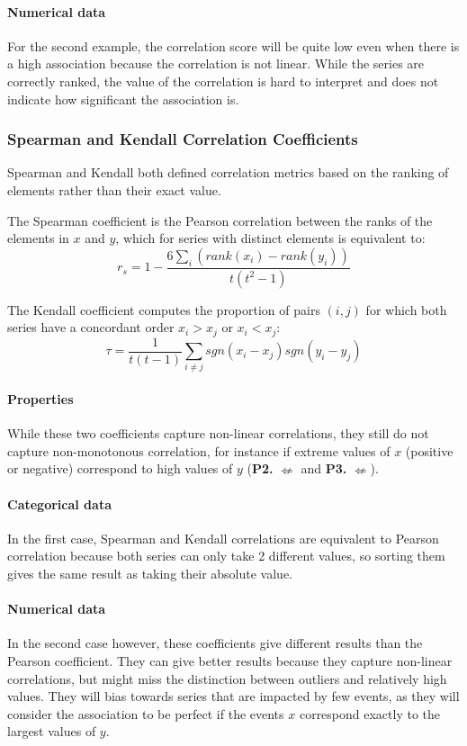 \documentclass[12pt,a4paper]{article}
\begin{document}
\paragraph{Numerical data}
For the second example, the correlation score will be quite low even when there is a high association because the correlation is not linear. While the series are correctly ranked, the value of the correlation is hard to interpret and does not indicate how significant the association is.


\subsubsection{Spearman and Kendall Correlation Coefficients}

Spearman and Kendall both defined correlation metrics based on the ranking of elements rather than their exact value. 

The Spearman coefficient is the Pearson correlation between the ranks of the elements in $x$ and $y$, which for series with distinct elements is equivalent to:
$$r_s = 1 - \dfrac{6 \sum_i (rank(x_i) - rank(y_i))}{t (t^2 - 1)}$$

The Kendall coefficient computes the proportion of pairs $(i, j)$ for which both series have a concordant order $x_i > x_j$ or $x_i < x_j$:
$$\tau = \dfrac{1}{t (t-1)}\sum_{i \neq j} sgn(x_i - x_j) sgn(y_i - y_j)$$

\paragraph{Properties}

While these two coefficients capture non-linear correlations, they still do not capture non-monotonous correlation, for instance if extreme values of $x$ (positive or negative) correspond to high values of $y$ (\textbf{P2.} $\nLeftarrow$ and \textbf{P3.} $\nLeftarrow$). 

\paragraph{Categorical data}

In the first case, Spearman and Kendall correlations are equivalent to Pearson correlation because both series can only take 2 different values, so sorting them gives the same result as taking their absolute value.

\paragraph{Numerical data}
In the second case however, these coefficients give different results than the Pearson coefficient. They can give better results because they capture non-linear correlations, but might miss the distinction between outliers and relatively high values.
They will bias towards series that are impacted by few events, as they will consider the association to be perfect if the events $x$ correspond exactly to the largest values of $y$.
\end{document}
